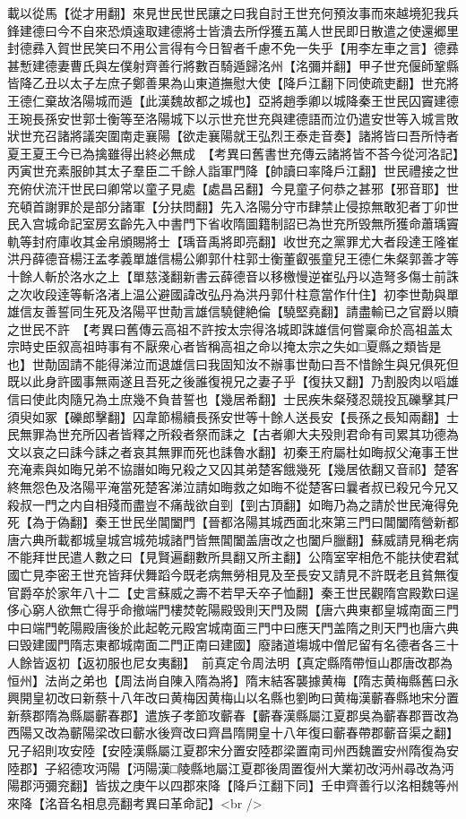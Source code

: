 載以從馬【從才用翻】來見世民世民讓之曰我自討王世充何預汝事而來越境犯我兵鋒建德曰今不自來恐煩遠取建德將士皆潰去所俘獲五萬人世民即日散遣之使還郷里封德彞入賀世民笑曰不用公言得有今日智者千慮不免一失乎【用李左車之言】德彞甚慙建德妻曹氏與左僕射齊善行將數百騎遁歸洺州【洺彌并翻】甲子世充偃師鞏縣皆降乙丑以太子左庶子鄭善果為山東道撫慰大使【降戶江翻下同使疏吏翻】世充將王德仁棄故洛陽城而遁【此漢魏故都之城也】亞將趙季卿以城降秦王世民囚竇建德王琬長孫安世郭士衡等至洛陽城下以示世充世充與建德語而泣仍遣安世等入城言敗狀世充召諸將議突圍南走襄陽【欲走襄陽就王弘烈王泰走音奏】諸將皆曰吾所恃者夏王夏王今已為擒雖得出終必無成　【考異曰舊書世充傳云諸將皆不荅今從河洛記】丙寅世充素服帥其太子羣臣二千餘人詣軍門降【帥讀曰率降戶江翻】世民禮接之世充俯伏流汗世民曰卿常以童子見處【處昌呂翻】今見童子何恭之甚邪【邪音耶】世充頓首謝罪於是部分諸軍【分扶問翻】先入洛陽分守市肆禁止侵掠無敢犯者丁卯世民入宫城命記室房玄齡先入中書門下省收隋圖籍制詔已為世充所毁無所獲命蕭瑀竇軌等封府庫收其金帛頒賜將士【瑀音禹將即亮翻】收世充之黨罪尤大者段達王隆崔洪丹薛德音楊汪孟孝義單雄信楊公卿郭什柱郭士衡董叡張童兒王德仁朱粲郭善才等十餘人斬於洛水之上【單慈淺翻新書云薛德音以移檄慢逆崔弘丹以造弩多傷士前誅之次收段逹等斬洛渚上温公避國諱改弘丹為洪丹郭什柱意當作什住】初李世勣與單雄信友善誓同生死及洛陽平世勣言雄信驍健絶倫【驍堅堯翻】請盡輸已之官爵以贖之世民不許　【考異曰舊傳云高祖不許按太宗得洛城即誅雄信何嘗稟命於高祖盖太宗時史臣叙高祖時事有不厭衆心者皆稱高祖之命以掩太宗之失如□夏縣之類皆是也】世勣固請不能得涕泣而退雄信曰我固知汝不辦事世勣曰吾不惜餘生與兄俱死但既以此身許國事無兩遂且吾死之後誰復視兄之妻子乎【復扶又翻】乃割股肉以㗖雄信曰使此肉隨兄為土庶幾不負昔誓也【幾居希翻】士民疾朱粲殘忍競投瓦礫擊其尸須臾如冢【礫郎擊翻】囚韋節楊續長孫安世等十餘人送長安【長孫之長知兩翻】士民無罪為世充所囚者皆釋之所殺者祭而誄之【古者卿大夫殁則君命有司累其功德為文以哀之曰誄今誄之者哀其無罪而死也誄魯水翻】初秦王府屬杜如晦叔父淹事王世充淹素與如晦兄弟不協譖如晦兄殺之又囚其弟楚客餓幾死【幾居依翻又音祁】楚客終無怨色及洛陽平淹當死楚客涕泣請如晦救之如晦不從楚客曰曩者叔已殺兄今兄又殺叔一門之内自相殘而盡豈不痛哉欲自剄【剄古頂翻】如晦乃為之請於世民淹得免死【為于偽翻】秦王世民坐閶闔門【晉都洛陽其城西面北來第三門曰閶闔隋營新都唐六典所載都城皇城宫城苑城諸門皆無閶闔盖唐改之也闔戶臘翻】蘇威請見稱老病不能拜世民遣人數之曰【見賢遍翻數所具翻又所主翻】公隋室宰相危不能扶使君弑國亡見李密王世充皆拜伏舞蹈今既老病無勞相見及至長安又請見不許既老且貧無復官爵卒於家年八十二【史言蘇威之壽不若早夭卒子恤翻】秦王世民觀隋宫殿歎曰逞侈心窮人欲無亡得乎命撤端門樓焚乾陽殿毁則天門及闕【唐六典東都皇城南面三門中曰端門乾陽殿唐後於此起乾元殿宮城南面三門中曰應天門盖隋之則天門也唐六典曰毁建國門隋志東都城南面二門正南曰建國】廢諸道塲城中僧尼留有名德者各三十人餘皆返初【返初服也尼女夷翻】　前真定令周法明【真定縣隋帶恒山郡唐改郡為恒州】法尚之弟也【周法尚自陳入隋為將】隋末結客襲據黄梅【隋志黄梅縣舊曰永興開皇初改曰新蔡十八年改曰黄梅因黄梅山以名縣也劉昫曰黄梅漢蘄春縣地宋分置新蔡郡隋為縣屬蘄春郡】遣族子孝節攻蘄春【蘄春漢縣屬江夏郡吳為蘄春郡晋改為西陽又改為蘄陽梁改曰蘄水後齊改曰齊昌隋開皇十八年復曰蘄春帶郡蘄音渠之翻】兄子紹則攻安陸【安陸漢縣屬江夏郡宋分置安陸郡梁置南司州西魏置安州隋復為安陸郡】子紹德攻沔陽【沔陽漢□陵縣地屬江夏郡後周置復州大業初改沔州尋改為沔陽郡沔彌兖翻】皆拔之庚午以四郡來降【降戶江翻下同】壬申齊善行以洺相魏等州來降【洺音名相息亮翻考異曰革命記】<br />
